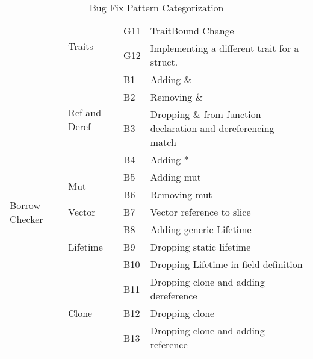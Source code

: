 \documentclass{article}
\begin{document}
\begin{table}[]
\begin{tabular}{|l|l|l|l|}
                                 & \multirow{2}{*}{Traits}        & G11 & TraitBound Change                                                   \\
                                 &                                & G12 & Implementing a different trait for a struct.                            \\\cline{1-3}
\multirow{13}{*}{Borrow Checker} & \multirow{4}{*}{Ref and Deref} & B1  & Adding \&                                                           \\
                                 &                                & B2  & Removing \&                                                         \\
                                 &                                & B3  & Dropping \& from function declaration and dereferencing match \\
                                 &                                & B4  & Adding *                                                            \\\cline{2-3}
                                 & \multirow{2}{*}{Mut}           & B5  & Adding mut                                                          \\
                                 &                                & B6  & Removing mut                                                        \\\cline{2-3}
                                 & Vector                         & B7  & Vector reference to slice                                           \\\cline{2-3}
                                 & \multirow{3}{*}{Lifetime}      & B8  & Adding generic Lifetime                                             \\
                                 &                                & B9  & Dropping static lifetime                                            \\
                                 &                                & B10 & Dropping Lifetime in field definition                               \\\cline{2-3}
                                 & \multirow{3}{*}{Clone}         & B11 & Dropping clone and adding dereference                               \\
                                 &                                & B12 & Dropping clone                                                      \\
                                 &                                & B13 & Dropping clone and adding reference  

\end{tabular}
\caption{\label{fig:category}Bug Fix Pattern Categorization}
\end{table}
\end{document}
